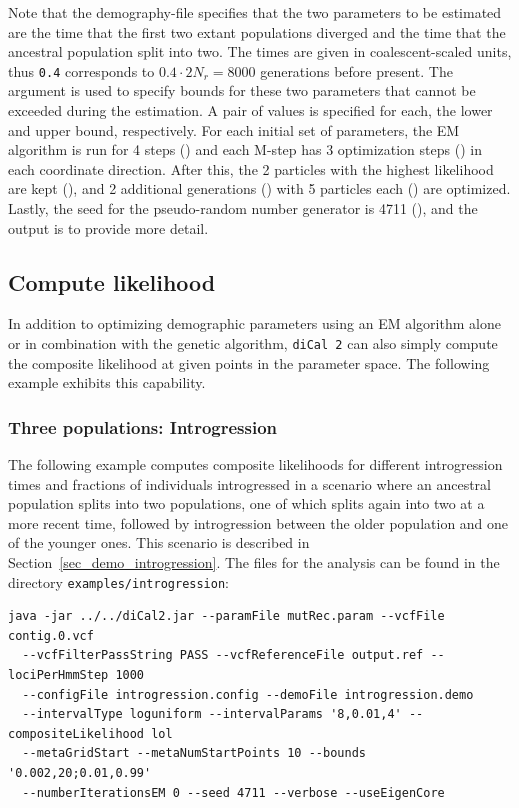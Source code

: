 \documentclass{article}
\numberwithin{equation}{section}
\begin{document}
Note that the demography-file specifies that the two parameters to be estimated are the time that the first two extant populations diverged and the time that the ancestral population split into two. The times are given in coalescent-scaled units, thus \texttt{0.4} corresponds to $0.4 \cdot 2 N_r = 8000$ generations before present. The argument  is used to specify bounds for these two parameters that cannot be exceeded during the estimation. A pair of values is specified for each, the lower and upper bound, respectively. For each initial set of parameters, the EM algorithm is run for 4 steps () and each M-step has 3 optimization steps () in each coordinate direction. After this, the 2 particles with the highest likelihood are kept (), and 2 additional generations () with 5 particles each () are optimized. Lastly, the seed for the pseudo-random number generator is 4711 (), and the output is  to provide more detail.

\subsection{Compute likelihood}
\label{sec_examples_likelihood}

In addition to optimizing demographic parameters using an EM algorithm alone or in combination with the genetic algorithm, \texttt{diCal 2} can also simply compute the composite likelihood at given points in the parameter space. The following example exhibits this capability.

\subsubsection{Three populations: Introgression}

The following example computes composite likelihoods for different introgression times and fractions of individuals introgressed in a scenario where an ancestral population splits into two populations, one of which splits again into two at a more recent time, followed by introgression between the older population and one of the younger ones. This scenario is described in Section~\ref{sec_demo_introgression}. The files for the analysis can be found in the directory \texttt{examples/introgression}:

\begin{verbatim}
java -jar ../../diCal2.jar --paramFile mutRec.param --vcfFile contig.0.vcf
  --vcfFilterPassString PASS --vcfReferenceFile output.ref --lociPerHmmStep 1000
  --configFile introgression.config --demoFile introgression.demo
  --intervalType loguniform --intervalParams '8,0.01,4' --compositeLikelihood lol
  --metaGridStart --metaNumStartPoints 10 --bounds '0.002,20;0.01,0.99'
  --numberIterationsEM 0 --seed 4711 --verbose --useEigenCore
\end{verbatim}
\end{document}
